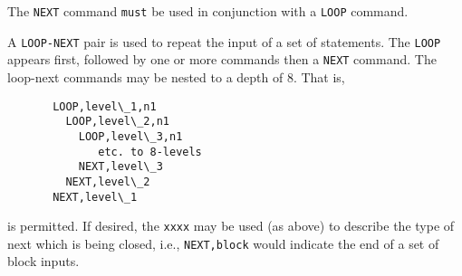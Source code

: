 \headb

The {\tt NEXT} command {\tt must} be used in conjunction
with a {\tt LOOP} command.

A {\tt LOOP-NEXT} pair is used to
repeat the input of a set of statements.  The {\tt LOOP}
appears first, followed by one or more commands then
a {\tt NEXT} command.  The loop-next commands may be
nested to a depth of 8.  That is,
\begin{verbatim}
       LOOP,level\_1,n1
         LOOP,level\_2,n1
           LOOP,level\_3,n1
              etc. to 8-levels
           NEXT,level\_3
         NEXT,level\_2
       NEXT,level\_1
\end{verbatim}
is permitted.
If desired, the {\tt xxxx} may be used (as above)
to describe the type of next which is being closed, i.e.,
{\tt NEXT,block} would indicate the end of a set of block inputs.

\vfill\eject
